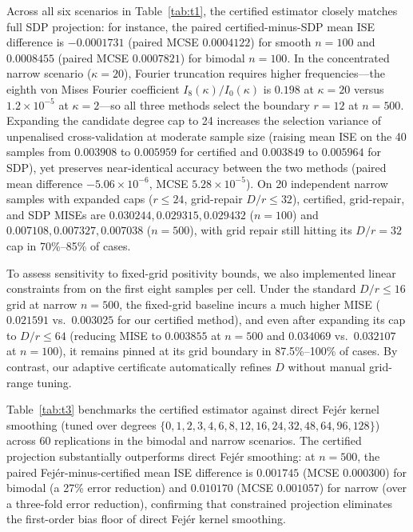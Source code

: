 Across all six scenarios in Table~\ref{tab:t1}, the certified estimator closely matches full SDP projection: for instance, the paired certified-minus-SDP mean ISE difference is \(-0.0001731\) (paired MCSE \(0.0004122\)) for smooth \(n=100\) and \(0.0008455\) (paired MCSE \(0.0007821\)) for bimodal \(n=100\). In the concentrated narrow scenario (\(\kappa=20\)), Fourier truncation requires higher frequencies---the eighth von Mises Fourier coefficient \(I_8(\kappa)/I_0(\kappa)\) is \(0.198\) at \(\kappa=20\) versus \(1.2\times10^{-5}\) at \(\kappa=2\)---so all three methods select the boundary \(r=12\) at \(n=500\). Expanding the candidate degree cap to 24 increases the selection variance of unpenalised cross-validation at moderate sample size (raising mean ISE on the 40 samples from \(0.003908\) to \(0.005959\) for certified and \(0.003849\) to \(0.005964\) for SDP), yet preserves near-identical accuracy between the two methods (paired mean difference \(-5.06\times10^{-6}\), MCSE \(5.28\times10^{-5}\)). On 20 independent narrow samples with expanded caps (\(r\le24\), grid-repair \(D/r\le32\)), certified, grid-repair, and SDP MISEs are \(0.030244, 0.029315, 0.029432\) (\(n=100\)) and \(0.007108, 0.007327, 0.007038\) (\(n=500\)), with grid repair still hitting its \(D/r=32\) cap in 70\%--85\% of cases.

To assess sensitivity to fixed-grid positivity bounds, we also implemented linear constraints from \citet{pfister2019} on the first eight samples per cell. Under the standard \(D/r\le16\) grid at narrow \(n=500\), the fixed-grid baseline incurs a much higher MISE (\(0.021591\) vs.\ \(0.003025\) for our certified method), and even after expanding its cap to \(D/r\le64\) (reducing MISE to \(0.003855\) at \(n=500\) and \(0.034069\) vs.\ \(0.032107\) at \(n=100\)), it remains pinned at its grid boundary in 87.5\%--100\% of cases. By contrast, our adaptive certificate automatically refines \(D\) without manual grid-range tuning.

Table~\ref{tab:t3} benchmarks the certified estimator against direct Fejér kernel smoothing (tuned over degrees \(\{0,1,2,3,4,6,8,12,16,24,32,48,64,96,128\}\)) across 60 replications in the bimodal and narrow scenarios. The certified projection substantially outperforms direct Fejér smoothing: at \(n=500\), the paired Fejér-minus-certified mean ISE difference is \(0.001745\) (MCSE \(0.000300\)) for bimodal (a 27\% error reduction) and \(0.010170\) (MCSE \(0.001057\)) for narrow (over a three-fold error reduction), confirming that constrained projection eliminates the first-order bias floor of direct Fejér kernel smoothing.

